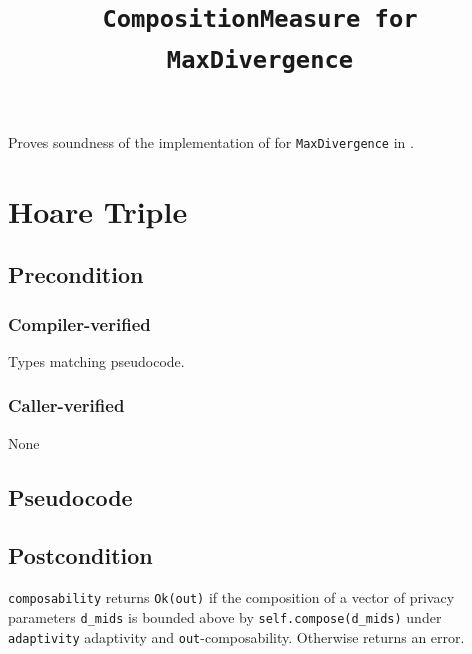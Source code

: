 \documentclass{article}
\title{\texttt{CompositionMeasure for MaxDivergence}}
\author{\MichaelShoemateAuthor}
\date{}
\begin{document}
\maketitle

\contrib
Proves soundness of the implementation of 
for \texttt{MaxDivergence} in .

\section{Hoare Triple}
\subsection*{Precondition}
\subsubsection*{Compiler-verified}
Types matching pseudocode.


\subsubsection*{Caller-verified}
None

\subsection*{Pseudocode}


\subsection*{Postcondition}
\begin{theorem}
  \texttt{composability} returns \texttt{Ok(out)} if the composition of a vector of privacy parameters \texttt{d\_mids}
  is bounded above by \texttt{self.compose(d\_mids)} under \texttt{adaptivity} adaptivity and \texttt{out}-composability.
  Otherwise returns an error.
\end{theorem}
\end{document}
